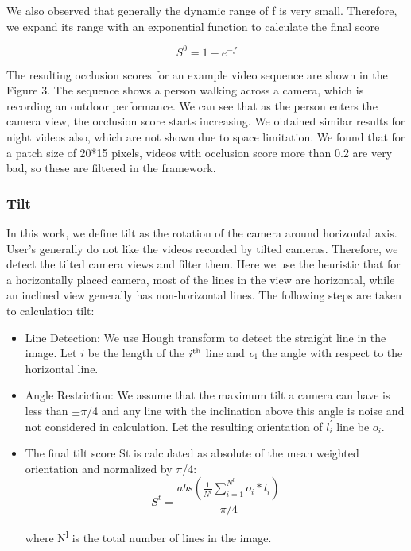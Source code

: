 \documentclass{new}
\begin{document}
We also observed that generally the dynamic range of f is very
small. Therefore, we expand its range with an exponential function
to calculate the final score %

\begin{equation}
S^0 = 1 - e^{-f}
\end{equation}


The resulting occlusion scores for an example video sequence
are shown in the Figure 3. The sequence shows a person walking
across a camera, which is recording an outdoor performance. We
can see that as the person enters the camera view, the occlusion
score starts increasing. We obtained similar results for night videos
also, which are not shown due to space limitation. We found that
for a patch size of 20*15 pixels, videos with occlusion score more
than 0.2 are very bad, so these are filtered in the framework.

\subsubsection{Tilt}

In this work, we define tilt as the rotation of the camera around
horizontal axis. User's generally do not like the videos recorded
by tilted cameras. Therefore, we detect the tilted camera views
and filter them. Here we use the heuristic that for a horizontally
placed camera, most of the lines in the view are horizontal, while
an inclined view generally has non-horizontal lines. The following
steps are taken to calculation tilt:

\begin{itemize}

\item Line Detection: We use Hough transform to detect the straight
line in the image. Let $i$ be the length of the $i\textsuperscript{th}$
 line and $o\textsubscript{i}$
the angle with respect to the horizontal line.

\item Angle Restriction: We assume that the maximum tilt a camera can have is less than $\pm \pi$/4 and any line with the inclination above this angle is noise and not considered in calculation. Let the resulting orientation of $l_i^{'}$ line be $o_i$.

\item The final tilt score St is calculated as absolute of the mean weighted orientation and normalized by $\pi$/4:
\begin{equation}
S^t = \frac{abs(\frac{1}{N^l}\sum_{i=1}^{N^l}o_i*l_i)}{\pi /4}
\end{equation}

where N\textsuperscript{l} is the total number of lines in the image.
\end{itemize}
\end{document}
